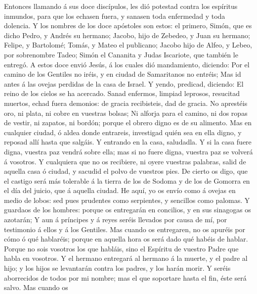  Entonces llamando á sus doce discípulos, les dió potestad
contra los espíritus inmundos, para que los echasen fuera, y sanasen
toda enfermedad y toda dolencia.  Y los nombres de los doce
apóstoles son estos: el primero, Simón, que es dicho Pedro, y Andrés su
hermano; Jacobo, hijo de Zebedeo, y Juan su hermano; 
Felipe, y Bartolomé; Tomás, y Mateo el publicano; Jacobo hijo de Alfeo,
y Lebeo, por sobrenombre Tadeo;  Simón el Cananita y Judas
Iscariote, que también le entregó.  A estos doce envió
Jesús, á los cuales dió mandamiento, diciendo: Por el camino de los
Gentiles no iréis, y en ciudad de Samaritanos no entréis; 
Mas id antes á las ovejas perdidas de la casa de Israel.  Y
yendo, predicad, diciendo: El reino de los cielos se ha acercado.
 Sanad enfermos, limpiad leprosos, resucitad muertos, echad
fuera demonios: de gracia recibisteis, dad de gracia.  No
aprestéis oro, ni plata, ni cobre en vuestras bolsas;  Ni
alforja para el camino, ni dos ropas de vestir, ni zapatos, ni bordón;
porque el obrero digno es de su alimento.  Mas en cualquier
ciudad, ó aldea donde entrareis, investigad quién sea en ella digno, y
reposad allí hasta que salgáis.  Y entrando en la casa,
saludadla.  Y si la casa fuere digna, vuestra paz vendrá
sobre ella; mas si no fuere digna, vuestra paz se volverá á vosotros.
 Y cualquiera que no os recibiere, ni oyere vuestras
palabras, salid de aquella casa ó ciudad, y sacudid el polvo de vuestros
pies.  De cierto os digo, que el castigo será más tolerable
á la tierra de los de Sodoma y de los de Gomorra en el día del juicio,
que á aquella ciudad.  He aquí, yo os envío como á ovejas
en medio de lobos: sed pues prudentes como serpientes, y sencillos como
palomas.  Y guardaos de los hombres: porque os entregarán
en concilios, y en sus sinagogas os azotarán;  Y aun á
príncipes y á reyes seréis llevados por causa de mí, por testimonio á
ellos y á los Gentiles.  Mas cuando os entregaren, no os
apuréis por cómo ó qué hablaréis; porque en aquella hora os será dado
qué habéis de hablar.  Porque no sois vosotros los que
habláis, sino el Espíritu de vuestro Padre que habla en vosotros.
 Y el hermano entregará al hermano á la muerte, y el padre
al hijo; y los hijos se levantarán contra los padres, y los harán morir.
 Y seréis aborrecidos de todos por mi nombre; mas el que
soportare hasta el fin, éste será salvo.  Mas cuando os
